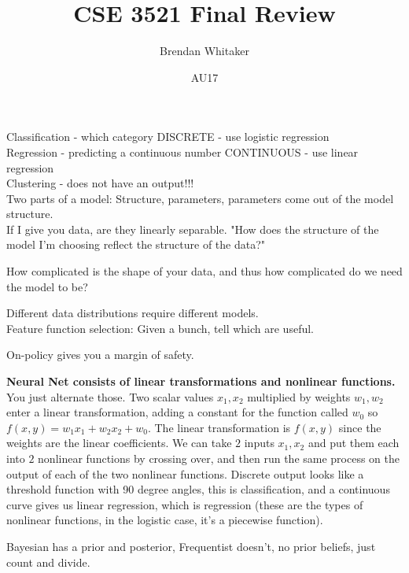 \documentclass[10pt,oneside,reqno]{amsart}
\theoremstyle{plain}
\theoremstyle{definition}
\begin{document}
\title{CSE 3521 Final Review}

\date{AU17}

\author[Brendan Whitaker]{Brendan Whitaker}

\maketitle
Classification - which category DISCRETE - use logistic regression\\
Regression - predicting a continuous number CONTINUOUS - use linear regression\\
Clustering - does not have an output!!! \\

Two parts of a model: Structure, parameters, parameters come out of the model structure. \\
If I give you data, are they linearly separable. "How does the structure of the model I'm choosing reflect the structure of the data?"

How complicated is the shape of your data, and thus how complicated do we need the model to be?

Different data distributions require different models. \\

Feature function selection: Given a bunch, tell which are useful. 

On-policy gives you a margin of safety. 

\textbf{Neural Net consists of linear transformations and nonlinear functions.} You just alternate those. 
Two scalar values $x_1,x_2$ multiplied by weights $w_1,w_2$ enter a linear transformation, adding a constant for the function called $w_0$ so $f(x,y) = w_1x_1 + w_2x_2 + w_0$. The linear transformation is $f(x,y)$ since the weights are the linear coefficients. We can take $2$ inputs $x_1,x_2$ and put them each into $2$ nonlinear functions by crossing over, and then run the same process on the output of each of the two nonlinear functions. Discrete output looks like a threshold function with 90 degree angles, this is classification, and a continuous curve gives us linear regression, which is regression (these are the types of nonlinear functions, in the logistic case, it's a piecewise function). 

Bayesian has a prior and posterior, Frequentist doesn't, no prior beliefs, just count and divide. 
\end{document}
